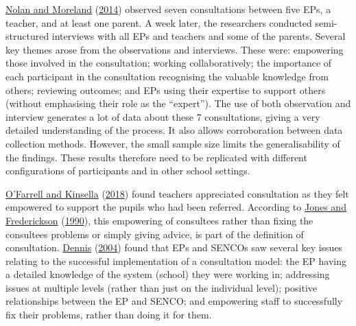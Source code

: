 \documentclass[
]{article}
\begin{document}
\protect\hyperlink{ref-nolanProcessPsychologicalConsultation2014}{Nolan
and Moreland}
(\protect\hyperlink{ref-nolanProcessPsychologicalConsultation2014}{2014})
observed seven consultations between five EPs, a teacher, and at least
one parent. A week later, the researchers conducted semi-structured
interviews with all EPs and teachers and some of the parents. Several
key themes arose from the observations and interviews. These were:
empowering those involved in the consultation; working collaboratively;
the importance of each participant in the consultation recognising the
valuable knowledge from others; reviewing outcomes; and EPs using their
expertise to support others (without emphasising their role as the
``expert''). The use of both observation and interview generates a lot
of data about these 7 consultations, giving a very detailed
understanding of the process. It also allows corroboration between data
collection methods. However, the small sample size limits the
generalisability of the findings. These results therefore need to be
replicated with different configurations of participants and in other
school settings.

\protect\hyperlink{ref-ofarrellResearchExploringParents2018}{O'Farrell
and Kinsella}
(\protect\hyperlink{ref-ofarrellResearchExploringParents2018}{2018})
found teachers appreciated consultation as they felt empowered to
support the pupils who had been referred. According to
\protect\hyperlink{ref-jonesRefocusingEducationPsychology1990}{Jones and
Frederickson}
(\protect\hyperlink{ref-jonesRefocusingEducationPsychology1990}{1990}),
this empowering of consultees rather than fixing the consultees problems
or simply giving advice, is part of the definition of consultation.
\protect\hyperlink{ref-dennisFarGoodQualitative2004}{Dennis}
(\protect\hyperlink{ref-dennisFarGoodQualitative2004}{2004}) found that
EPs and SENCOs saw several key issues relating to the successful
implementation of a consultation model: the EP having a detailed
knowledge of the system (school) they were working in; addressing issues
at multiple levels (rather than just on the individual level); positive
relationships between the EP and SENCO; and empowering staff to
successfully fix their problems, rather than doing it for them.
\end{document}
